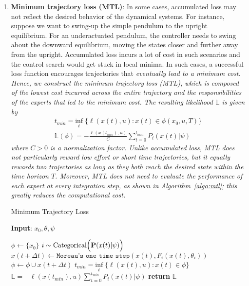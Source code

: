 \begin{enumerate}
  
    \item \textbf{Minimum trajectory loss (MTL)}: In some cases,
    accumulated loss may not reflect the desired behavior of the dynamical
    systems.
    For instance, suppose we want to swing-up the simple pendulum to the upright
    equilibrium. 
    For an underactuated pendulum, the controller needs to swing about the
    downward equilibrium, moving the states closer and further away from the
    upright.
    Accumulated loss incurs a lot of cost in such scenarios and the control
    search would get stuck in local minima.
    In such cases, a successful loss function encourages trajectories that
    \it{eventually} \normalfont lead to a minimum cost.
    Hence, we construct the minimum trajectory loss (MTL), which is composed of
    the lowest cost incurred across the entire trajectory and the
    responsibilities of the experts that led to the minimum cost.
    The resulting likelihood $\mathbb{L}$ is given by
    \begin{equation}
        \begin{gathered}
            t_{min} = \underset{t}{\textrm{inf}} \; \{ \ell(x(t), u): x(t) \in \phi(x_0, u, T) \}  \\
            \mathbb{L}(\phi) = - \frac{\ell(x(t_{min}), u)}{C} \sum_{t=0}^{t_{min}}P_i(x(t) | \psi) 
        \end{gathered} 
    \end{equation}
    \noindent where $C > 0$ is a normalization factor.
    Unlike accumulated loss, MTL does not particularly reward low effort or
    short time trajectories, but it equally rewards two trajectories
    as long as they both reach the desired state within the time horizon $T$. 
    Moreover, MTL does not need to evaluate the performance of each expert at
    every integration step, as shown in Algorithm~\eqref{algo:mtl}; this greatly
    reduces the computational cost.
    \begin{algorithm}[tb]
        \caption{Minimum Trajectory Loss}
        \label{algo:mtl}
        \small
        \hspace*{\algorithmicindent} \textbf{Input}: $x_0, \theta, \psi$
        \begin{algorithmic}[1]
            \State $\phi \leftarrow \{ x_0 \}$
                    \State $i \sim \text{Categorical}\Bigl(\mathbf{P}(x(t)| \psi)\Bigr)$ 
                    \State $x(t + \Delta t) \leftarrow \texttt{Moreau's one time step}(x(t), F_i(x(t), \theta_i))$
                    \State $\phi \leftarrow \phi \cup x(t+\Delta t)$
                \EndFor
                \State $t_{min} = \underset{t}{\textrm{inf}} \; \{ \ell(x(t), u): x(t) \in \phi\}$
                \State $\mathbb{L} = - \ell(x(t_{min}), u) \sum_{t=0}^{t_{min}}P_i(x(t) | \psi)  $
            \State \textbf{return} $\mathbb{L}$
        \end{algorithmic}
    \end{algorithm}
\end{enumerate}

